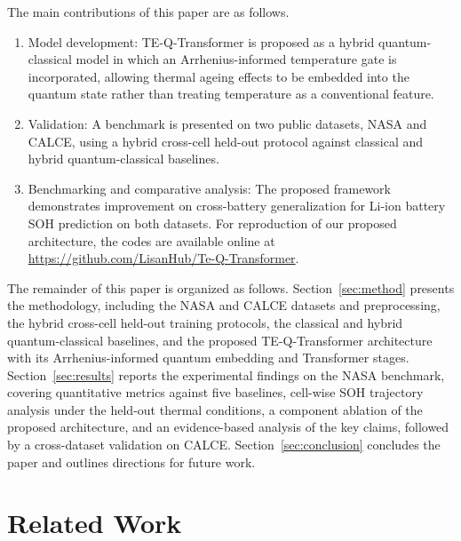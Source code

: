 \documentclass[a4paper,fleqn]{cas-sc}
\begin{document}
The main contributions of this paper are as follows.
\begin{enumerate}[label=(\roman*)]
\item Model development: TE-Q-Transformer is proposed as a hybrid quantum-classical model in which an Arrhenius-informed temperature gate is incorporated, allowing thermal ageing effects to be embedded into the quantum state rather than treating temperature as a conventional feature. 
\item Validation: A benchmark is presented on two public datasets, NASA and CALCE, using a hybrid cross-cell held-out protocol against classical and hybrid quantum-classical baselines.
\item Benchmarking and comparative analysis: The proposed framework demonstrates improvement on cross-battery generalization for Li-ion battery SOH prediction on both datasets. For reproduction of our proposed architecture, the codes are available online at \href{https://github.com/LisanHub/Te-Q-Transformer}{https://github.com/LisanHub/Te-Q-Transformer}.
\end{enumerate}

The remainder of this paper is organized as follows. Section~\ref{sec:method} presents the methodology, including the NASA and CALCE datasets and preprocessing, the hybrid cross-cell held-out training protocols, the classical and hybrid quantum-classical baselines, and the proposed TE-Q-Transformer architecture with its Arrhenius-informed quantum embedding and Transformer stages. Section~\ref{sec:results} reports the experimental findings on the NASA benchmark, covering quantitative metrics against five baselines, cell-wise SOH trajectory analysis under the held-out thermal conditions, a component ablation of the proposed architecture, and an evidence-based analysis of the key claims, followed by a cross-dataset validation on CALCE. Section~\ref{sec:conclusion} concludes the paper and outlines directions for future work.



\section{Related Work}\label{sec:related}
\end{document}
